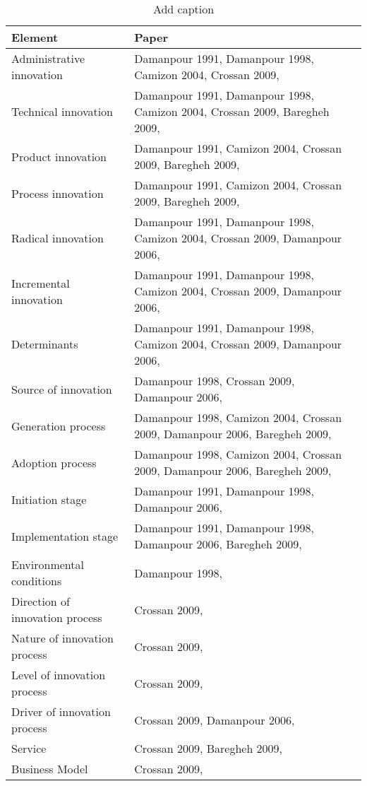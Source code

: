 \begin{table}[htbp]
  \centering
  \caption{Add caption}
    \begin{tabular}{|p{5cm}|p{9cm}|}
    \toprule
    \textbf{Element} & \textbf{Paper} \\
    \midrule
    Administrative innovation & Damanpour 1991, Damanpour 1998, Camizon 2004, Crossan 2009,  \\
    Technical innovation & Damanpour 1991, Damanpour 1998, Camizon 2004, Crossan 2009, Baregheh 2009,  \\
    Product innovation & Damanpour 1991, Camizon 2004, Crossan 2009, Baregheh 2009,  \\
    Process innovation & Damanpour 1991, Camizon 2004, Crossan 2009, Baregheh 2009,  \\
    Radical innovation & Damanpour 1991, Damanpour 1998, Camizon 2004, Crossan 2009, Damanpour 2006,  \\
    Incremental innovation & Damanpour 1991, Damanpour 1998, Camizon 2004, Crossan 2009, Damanpour 2006,  \\
    Determinants & Damanpour 1991, Damanpour 1998, Camizon 2004, Crossan 2009, Damanpour 2006,  \\
    Source of innovation & Damanpour 1998, Crossan 2009, Damanpour 2006,  \\
    Generation process & Damanpour 1998, Camizon 2004, Crossan 2009, Damanpour 2006, Baregheh 2009,  \\
    Adoption process & Damanpour 1998, Camizon 2004, Crossan 2009, Damanpour 2006, Baregheh 2009,  \\
    Initiation stage & Damanpour 1991, Damanpour 1998, Damanpour 2006,  \\
    Implementation stage & Damanpour 1991, Damanpour 1998, Damanpour 2006, Baregheh 2009,  \\
    Environmental conditions & Damanpour 1998, \\
    Direction of innovation process  & Crossan 2009,  \\
    Nature of innovation process & Crossan 2009,  \\
    Level of innovation process & Crossan 2009,  \\
    Driver of innovation process & Crossan 2009, Damanpour 2006,  \\
    Service & Crossan 2009, Baregheh 2009,  \\
    Business Model & Crossan 2009,  \\

\end{tabular}
\end{table}
